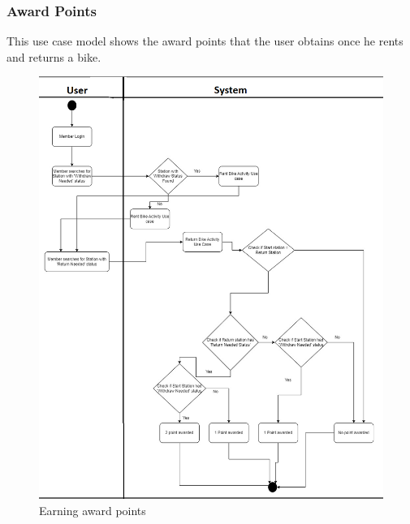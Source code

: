 \subsubsection{Award Points}
This use case model shows the award points that the user obtains once he rents and returns a bike.
\begin{figure}[H]
  \centering
  \includegraphics[scale = 0.60]{images/AwardPointsActivityDiagram.png}
  \caption{Earning award points}
  \label{fig:Earning_awards}
\end{figure}

\newpage

